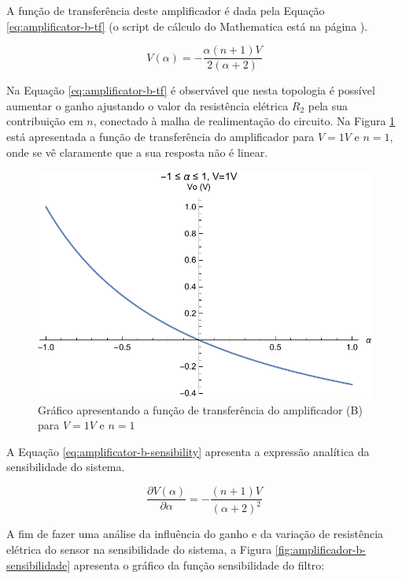 \documentclass[a4paper]{instrumentacao}
\begin{document}
A função de transferência deste amplificador é dada pela Equação \ref{eq:amplificator-b-tf} (o script de cálculo do Mathematica está na página \pageref{att:amplificadores}).

\begin{equation}
	V(\alpha) = -\frac{\alpha  (n+1) V}{2 (\alpha +2)}
	\label{eq:amplificator-b-tf}
\end{equation}

Na Equação \ref{eq:amplificator-b-tf} é observável que nesta topologia é possível aumentar o ganho ajustando o valor da resistência elétrica $R_2$ pela sua contribuição em $n$, conectado à malha de realimentação do circuito. Na Figura \ref{fig:amplificador-b-tf} está apresentada a função de transferência do amplificador para $V=1V$ e $n=1$, onde se vê claramente que a sua resposta não é linear.

\begin{figure}[H]
\center
\includegraphics[width=\textwidth]{Amplificador-B-TF.pdf}
\caption{Gráfico apresentando a função de transferência do amplificador (B) para $V=1V$ e $n=1$}
\label{fig:amplificador-b-tf}
\end{figure}

A Equação \ref{eq:amplificator-b-sensibility} apresenta a expressão analítica da sensibilidade do sistema.

\begin{equation}
	\frac{\partial V(\alpha)}{\partial \alpha} = -\frac{(n+1) V}{(\alpha +2)^2}
	\label{eq:amplificator-b-sensibility}
\end{equation}

A fim de fazer uma análise da influência do ganho e da variação de resistência elétrica do sensor na sensibilidade do sistema, a Figura \ref{fig:amplificador-b-sensibilidade} apresenta o gráfico da função sensibilidade do filtro:
\end{document}
